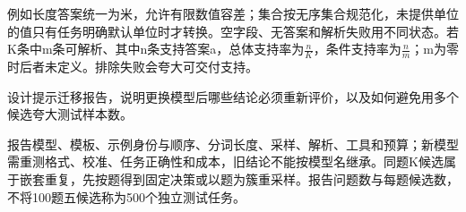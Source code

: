 \begin{exercises}
\begin{exercise}
\begin{solution}
例如长度答案统一为米，允许有限数值容差；集合按无序集合规范化，未提供单位的值只有任务明确默认单位时才转换。空字段、无答案和解析失败用不同状态。若K条中m条可解析、其中n条支持答案a，总体支持率为$\frac{n}{K}$，条件支持率为$\frac{n}{m}$；m为零时后者未定义。排除失败会夸大可交付支持。
\end{solution}
\end{exercise}

\begin{exercise} 设计提示迁移报告，说明更换模型后哪些结论必须重新评价，以及如何避免用多个候选夸大测试样本数。

\begin{solution}
报告模型、模板、示例身份与顺序、分词长度、采样、解析、工具和预算；新模型需重测格式、校准、任务正确性和成本，旧结论不能按模型名继承。同题K候选属于嵌套重复，先按题得到固定决策或以题为簇重采样。报告问题数与每题候选数，不将100题五候选称为500个独立测试任务。
\end{solution}
\end{exercise}

\end{exercises}
